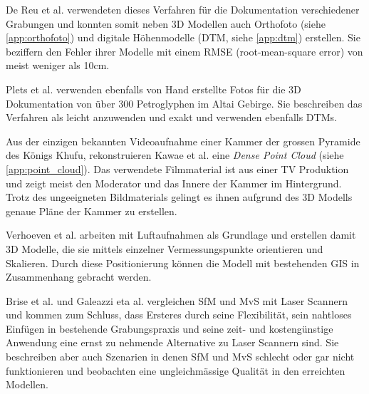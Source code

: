 			De Reu et al. \cite{DeReu20131108} verwendeten dieses Verfahren für die Dokumentation verschiedener Grabungen und konnten somit neben 3D Modellen auch Orthofoto (siehe \autoref{app:orthofoto}) und digitale Höhenmodelle (DTM, siehe \autoref{app:dtm}) erstellen. Sie beziffern den Fehler ihrer Modelle mit einem RMSE (root-mean-square error) von meist weniger als 10cm.
			
			Plets et al. \cite{altai} verwenden ebenfalls von Hand erstellte Fotos für die 3D Dokumentation von über 300 Petroglyphen im Altai Gebirge. Sie beschreiben das Verfahren als leicht anzuwenden und exakt und verwenden ebenfalls DTMs.
			
			Aus der einzigen bekannten Videoaufnahme einer Kammer der grossen Pyramide des Königs Khufu, rekonstruieren Kawae et al. \cite{the_cave} eine \emph{Dense Point Cloud} (siehe \autoref{app:point_cloud}). Das verwendete Filmmaterial ist aus einer TV Produktion und zeigt meist den Moderator und das Innere der Kammer im Hintergrund. Trotz des ungeeigneten Bildmaterials gelingt es ihnen aufgrund des 3D Modells genaue Pläne der Kammer zu erstellen.
			
			Verhoeven et al. \cite{ARP:ARP399, ARCM:ARCM667} arbeiten mit Luftaufnahmen als Grundlage und erstellen damit 3D Modelle, die sie mittels einzelner Vermessungspunkte orientieren und Skalieren. Durch diese Positionierung können die Modell mit bestehenden GIS in Zusammenhang gebracht werden.
			
			Brise et al. \cite{TUW-210216} und Galeazzi eta al. \cite{arch:laser_vs_dense_stereo} vergleichen SfM und MvS mit Laser Scannern und kommen zum Schluss, dass Ersteres durch seine Flexibilität, sein nahtloses Einfügen in bestehende Grabungspraxis und seine zeit- und kostengünstige Anwendung eine ernst zu nehmende Alternative zu Laser Scannern sind. Sie beschreiben aber auch Szenarien in denen SfM und MvS schlecht oder gar nicht funktionieren und beobachten eine ungleichmässige Qualität in den erreichten Modellen.